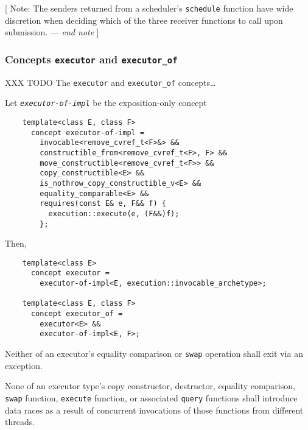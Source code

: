 \documentclass[a4paper,12pt,notitlepage,twoside,openright]{article}
\begin{document}
{[} Note: The senders returned from a scheduler's
\texttt{schedule} function have wide discretion when
deciding which of the three receiver functions to call upon submission.
--- \emph{end note} {]}

\hypertarget{concepts-executor-and-executor_of}{%
\subsubsection{\texorpdfstring{Concepts \texttt{executor}
and
\texttt{executor_of}}{Concepts  and }}\label{concepts-executor-and-executor_of}}

XXX TODO The \texttt{executor} and
\texttt{executor_of} concepts\ldots{}

Let \emph{\texttt{executor-of-impl}} be the exposition-only
concept

\begin{verbatim}
    template<class E, class F>
      concept executor-of-impl =
        invocable<remove_cvref_t<F>&> &&
        constructible_from<remove_cvref_t<F>, F> &&
        move_constructible<remove_cvref_t<F>> &&
        copy_constructible<E> &&
        is_nothrow_copy_constructible_v<E> &&
        equality_comparable<E> &&
        requires(const E& e, F&& f) {
          execution::execute(e, (F&&)f);
        };
\end{verbatim}

Then,

\begin{verbatim}
    template<class E>
      concept executor =
        executor-of-impl<E, execution::invocable_archetype>;

    template<class E, class F>
      concept executor_of =
        executor<E> &&
        executor-of-impl<E, F>;
\end{verbatim}

Neither of an executor's equality comparison or
\texttt{swap} operation shall exit via an exception.

None of an executor type's copy constructor, destructor, equality
comparison, \texttt{swap} function,
\texttt{execute} function, or associated
\texttt{query} functions shall introduce data races as a
result of concurrent invocations of those functions from different
threads.
\end{document}
